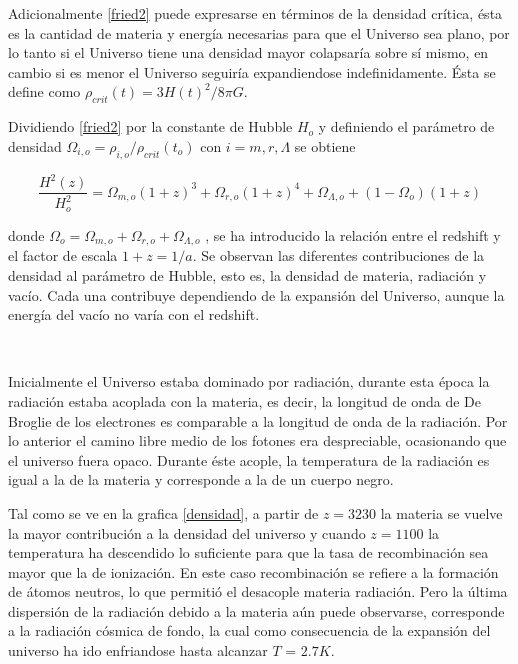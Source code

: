 Adicionalmente \ref{fried2} puede expresarse en términos de la densidad 
crítica, ésta es la cantidad de materia y energía necesarias para que el 
Universo sea plano, por lo tanto si el Universo tiene una densidad mayor 
colapsaría sobre sí mismo, en cambio si es menor el Universo seguiría 
expandiendose indefinidamente. Ésta se define como 
$\rho_{crit}(t)= 3H(t)^2/8\pi G$.


Dividiendo \ref{fried2} por la constante de Hubble $H_o$ y definiendo 
el parámetro de densidad $\Omega_{i,o} = \rho_{i,o}/\rho_{crit}(t_o)$ con
$i=m,r,\Lambda$ se obtiene 

\begin{equation}
\frac{H^2(z)}{H_o^{2}}=\Omega_{m,o}\left(1+z\right)^3+
\Omega_{r,o}\left(1+z\right)^4+ \Omega_{\Lambda,o} + ( 1-\Omega_o)
\left(1+z\right)
\label{fried2}
\end{equation}

donde $\Omega_o=\Omega_{m,o} +\Omega_{r,o}+\Omega_{\Lambda,o}$ ,
se ha introducido la relación entre el redshift y el factor de escala 
$1+z=1/a$. Se observan las diferentes contribuciones de la densidad al 
parámetro de Hubble, esto es, la densidad de materia, radiación y vacío. 
Cada una contribuye dependiendo de la expansión del Universo, aunque 
la energía del vacío no varía con el redshift.

\

Inicialmente el Universo estaba dominado por radiación, 
durante esta época la radiación estaba acoplada con la materia, 
es decir, la longitud de onda de De Broglie de los electrones es 
comparable a la longitud de onda de la radiación. Por lo anterior 
el camino libre medio de los fotones era despreciable, ocasionando
que el universo fuera opaco. 
Durante éste acople, la temperatura de la radiación es igual a 
la de la materia y corresponde a la de un cuerpo negro. 

Tal como se ve en la grafica \ref{densidad}, a partir de $z=3230$ la materia
se vuelve la mayor contribuci\'on a la densidad del universo y
cuando $z=1100$ la temperatura ha descendido lo suficiente para que 
la tasa de recombinación sea mayor que la de ionización. 
En este caso recombinación se refiere a la formación de átomos neutros, 
lo que permitió el desacople materia radiación.
Pero la última dispersión de la radiación debido a la 
materia aún puede observarse, corresponde a la radiación 
cósmica de fondo, la cual como consecuencia de la expansión del universo 
ha ido enfriandose hasta alcanzar $T$ = $2.7K$. 
  
